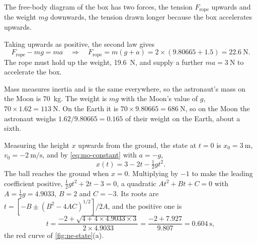 The free-body diagram of the box has two forces,
the tension $F_{\mathrm{rope}}$ upwards and the weight $mg$ downwards,
the tension drawn longer because the box accelerates upwards.
\begin{center}
\end{center}
Taking upwards as positive, the second law gives
\begin{equation*}
   F_{\mathrm{rope}} - mg = ma
   \quad\Longrightarrow\quad
   F_{\mathrm{rope}} = m(g + a) = 2\times(9.80665 + 1.5)
   = \SI{22.6}{\newton} .
\end{equation*}
The rope must hold up the weight, \SI{19.6}{\newton}, and supply a further
$ma = \SI{3}{\newton}$ to accelerate the box.

Mass measures inertia and is the same everywhere,
so the astronaut's mass on the Moon is \SI{70}{\kilogram}. The weight is
$mg$ with the Moon's value of $g$, $70\times1.62 = \SI{113}{\newton}$. On
the Earth it is $70\times9.80665 = \SI{686}{\newton}$, so on the Moon the
astronaut weighs $1.62/9.80665 = 0.165$ of their weight on the Earth, about
a sixth.

Measuring the height $x$ upwards from the ground,
the state at $t = 0$ is $x_0 = \SI{3}{\metre}$, $v_0 =
\SI{-2}{\metre\per\second}$, and by \cref{eq:mo-constant} with $a = -g$,
\begin{equation*}
   x(t) = 3 - 2t - \tfrac12 g t^2 .
\end{equation*}
The ball reaches the ground when $x = 0$. Multiplying by $-1$ to make the
leading coefficient positive, $\tfrac12 g t^2 + 2t - 3 = 0$, a quadratic
$At^2 + Bt + C = 0$ with $A = \tfrac12 g = 4.9033$, $B = 2$ and $C = -3$. Its roots are
$t = [-B \pm (B^2 - 4AC)^{1/2}]/2A$, and the positive one is
\begin{equation*}
   t = \frac{-2 + \sqrt{4 + 4\times4.9033\times3}}{2\times4.9033}
   = \frac{-2 + 7.927}{9.807} = \SI{0.604}{\second} ,
\end{equation*}
the red curve of \cref{fig:ne-state}(a).

